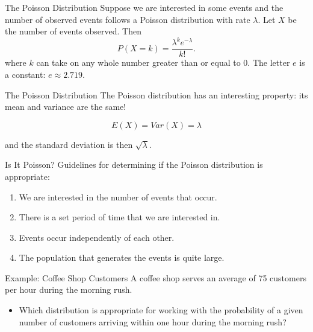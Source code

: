 \begin{frame}{The Poisson Distribution}
    Suppose we are interested in some events and the number of observed events follows a Poisson distribution with rate $\lambda$. Let $X$ be the number of events observed. Then
    \[
        P(X=k) = \frac{\lambda^k e^{-\lambda}}{k!}.
    \]
    where $k$ can take on any whole number greater than or equal to 0. The letter $e$ is a constant: $e\approx 2.719$.
\end{frame}

\begin{frame}{The Poisson Distribution}
    The Poisson distribution has an interesting property: its mean and variance are the same!
    
    \[
    E(X) = Var(X) = \lambda
    \]
    
    and the standard deviation is then $\sqrt{\lambda}$.
\end{frame}

\begin{frame}{Is It Poisson?}
    Guidelines for determining if the Poisson distribution is appropriate:
    \begin{enumerate}
        \item We are interested in the number of events that occur.
        \item There is a set period of time that we are interested in.
        \item Events occur independently of each other.
        \item The population that generates the events is quite large.
    \end{enumerate}
\end{frame}

\begin{frame}{Example: Coffee Shop Customers}
    A coffee shop serves an average of 75 customers per hour during the morning rush.
    \begin{itemize}
        \item Which distribution is appropriate for working with the probability of a given number of customers arriving within one hour during the morning rush?
    \end{itemize}
\end{frame}

